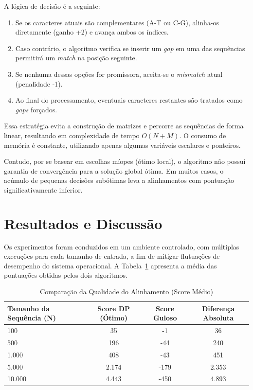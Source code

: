 \documentclass[12pt]{article}
\begin{document}
A lógica de decisão é a seguinte:
\begin{enumerate}
    \item Se os caracteres atuais são complementares (A-T ou C-G), alinha-os diretamente (ganho +2) e avança ambos os índices.
    \item Caso contrário, o algoritmo verifica se inserir um \textit{gap} em uma das sequências permitirá um \textit{match} na posição seguinte.
    \item Se nenhuma dessas opções for promissora, aceita-se o \textit{mismatch} atual (penalidade -1).
    \item Ao final do processamento, eventuais caracteres restantes são tratados como \textit{gaps} forçados.
\end{enumerate}

Essa estratégia evita a construção de matrizes e percorre as sequências de forma linear, resultando em complexidade de tempo $O(N + M)$. O consumo de memória é constante, utilizando apenas algumas variáveis escalares e ponteiros.

Contudo, por se basear em escolhas míopes (ótimo local), o algoritmo não possui garantia de convergência para a solução global ótima. Em muitos casos, o acúmulo de pequenas decisões subótimas leva a alinhamentos com pontuação significativamente inferior.

\section{Resultados e Discussão}
\label{sec:resultados}

Os experimentos foram conduzidos em um ambiente controlado, com múltiplas execuções para cada tamanho de entrada, a fim de mitigar flutuações de desempenho do sistema operacional. A Tabela~\ref{tab:comparacao_scores} apresenta a média das pontuações obtidas pelos dois algoritmos.

\begin{table}[!htb]
\centering
\caption{Comparação da Qualidade do Alinhamento (Score Médio)}
\label{tab:comparacao_scores}
\begin{tabular}{@{}lccc@{}}
\toprule
\textbf{Tamanho da Sequência (N)} & \textbf{Score DP (Ótimo)} & \textbf{Score Guloso} & \textbf{Diferença Absoluta} \\ \midrule
100   & 35    & -1    & 36    \\
500   & 196   & -44   & 240   \\
1.000 & 408   & -43   & 451   \\
5.000 & 2.174 & -179  & 2.353 \\
10.000& 4.443 & -450  & 4.893 \\ \bottomrule
\end{tabular}
\end{table}
\end{document}
